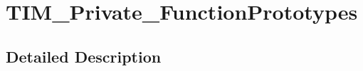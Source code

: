 \hypertarget{group___t_i_m___private___function_prototypes}{\section{T\-I\-M\-\_\-\-Private\-\_\-\-Function\-Prototypes}
\label{group___t_i_m___private___function_prototypes}
}


\subsection{Detailed Description}
